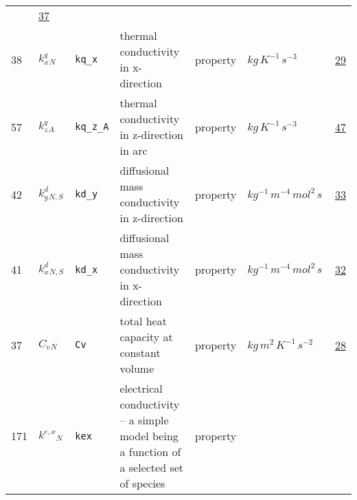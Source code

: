 \begin{longtable}{|p{1cm}|p{2.5cm}|p{4.5cm}|p{8cm}|p{3.0cm}|p{3cm}|p{1cm}|}
             &                 \hyperlink{"e:37"}{ 37 }
                 \\
            38
             & \hypertarget{"v:38"}{ $ {{k^q_x}}{_{N}} $}
             & \verb|kq_x|
             & thermal conductivity in x-direction
             & \begin{lay}property \end{lay}
             & $ kg \,K^{-1} \,s^{-3} \, $
             &                 \hyperlink{"e:29"}{ 29 }
                 \\
            57
             & \hypertarget{"v:57"}{ $ {{k^q_z}}{_{A}} $}
             & \verb|kq_z_A|
             & thermal conductivity in z-direction in arc
             & \begin{lay}property \end{lay}
             & $ kg \,K^{-1} \,s^{-3} \, $
             &                 \hyperlink{"e:47"}{ 47 }
                 \\
            42
             & \hypertarget{"v:42"}{ $ {{k^d_y}}{_{N, S}} $}
             & \verb|kd_y|
             & diffusional mass conductivity in z-direction
             & \begin{lay}property \end{lay}
             & $ kg^{-1} \,m^{-4} \,mol^{2} \,s \, $
             &                 \hyperlink{"e:33"}{ 33 }
                 \\
            41
             & \hypertarget{"v:41"}{ $ {{k^d_x}}{_{N, S}} $}
             & \verb|kd_x|
             & diffusional mass conductivity in x-direction
             & \begin{lay}property \end{lay}
             & $ kg^{-1} \,m^{-4} \,mol^{2} \,s \, $
             &                 \hyperlink{"e:32"}{ 32 }
                 \\
            37
             & \hypertarget{"v:37"}{ $ {{C_v}}{_{N}} $}
             & \verb|Cv|
             & total heat capacity at constant volume
             & \begin{lay}property \end{lay}
             & $ kg \,m^{2} \,K^{-1} \,s^{-2} \, $
             &                 \hyperlink{"e:28"}{ 28 }
                 \\
            171
             & \hypertarget{"v:171"}{ $ {{k^{e,x}}}{_{N}} $}
             & \verb|kex|
             & electrical conductivity -- a simple model being a function of a selected set of species
             & \begin{lay}property \end{lay}

\end{longtable}
